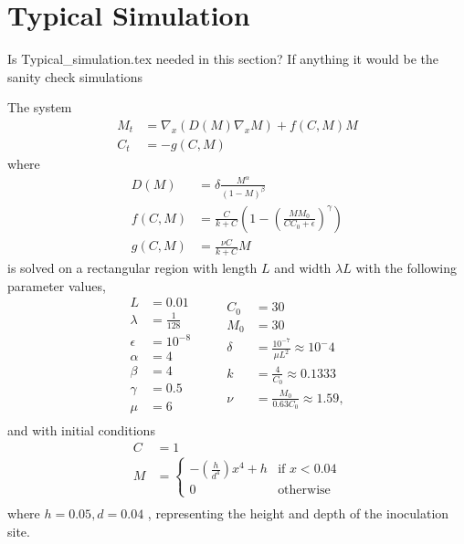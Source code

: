 \section{Typical Simulation}
Is Typical\_simulation.tex needed in this section?
If anything it would be the sanity check simulations


The system
  \begin{align}
    M_t &= \nabla_x \left( D(M) \nabla_x M \right) + f(C,M) M \\
    C_t &= - g(C,M) 
  \end{align}
  where
  \begin{align}
    D(M) &= \delta \frac{M^\alpha}{(1 - M)^\beta} \\
    f(C,M) &= \frac{ C }{{k } + {C}} \left(1 - \left( \frac{M M_0}{{C C_0 + \epsilon}} \right)^\gamma \right) \\
    g(C,M) &= \frac{\nu C}{k +C} M
  \end{align}
  is solved on a rectangular region with length $L$ and width $\lambda L$ with the following parameter values,
  \begin{equation}
    \begin{aligned}
      L &= 0.01 \\
      \lambda &= \frac{1}{128}\\
      \epsilon &= 10^{-8}\\
      \alpha &= 4 \\
      \beta &= 4 \\
      \gamma &= 0.5 \\
      \mu &= 6 \\      
    \end{aligned}
    \qquad
    \begin{aligned}
      C_0 &= 30 \\
      M_0 &= 30 \\
      \delta &= \frac{10^{-7}}{\mu L^2} \approx 10^-4\\
      k &= \frac{4}{C_0} \approx 0.1333\\
      \nu &= \frac{M_0}{0.63 C_0} \approx 1.59,\\
    \end{aligned}
  \end{equation}
  and with initial conditions 
  \begin{equation}
    \begin{aligned}
      C &= 1 \\
      M &= \begin{cases} -(\frac{h}{d^4})x^4 + h & \text{if } x < 0.04 \\ 0 & \text{otherwise }\end{cases} \\
    \end{aligned}
  \end{equation}  
  where $h = 0.05, d=0.04$ , representing the height and depth of the inoculation site.

